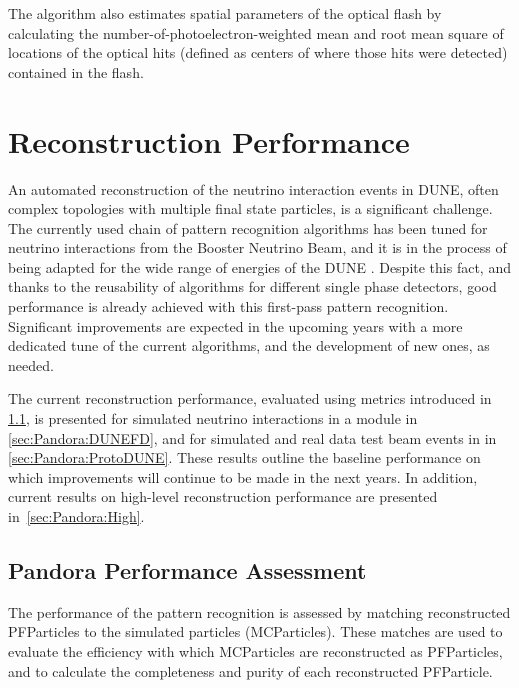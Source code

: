The algorithm also estimates spatial parameters of the optical flash
by calculating the number-of-photoelectron-weighted mean and 
root mean square of locations of the optical hits
(defined as centers of  where those hits were detected)
contained in the flash.

\section{Reconstruction Performance}
\label{sec:performance}

An automated reconstruction of the neutrino interaction events in DUNE, often complex topologies with multiple final state particles, is a significant challenge. The currently used chain of  pattern recognition algorithms %
has been tuned for neutrino interactions from the \fnal Booster Neutrino Beam, and it is in the process of being adapted for the wide range of energies of the DUNE . Despite this fact, and thanks to the reusability of  algorithms for different single phase \lartpc detectors,  good performance is already achieved with this first-pass pattern recognition. Significant improvements are expected  in the upcoming years with a more dedicated tune of the current algorithms, and the development of new ones, as needed. %

The current reconstruction performance, evaluated using metrics introduced in \ref{sec:Pandora:assessment}, is presented for simulated neutrino interactions in a \single \nominalmodsize {} module in \ref{sec:Pandora:DUNEFD}, and for simulated and real data test beam events in  in \ref{sec:Pandora:ProtoDUNE}. These results outline the baseline performance on which improvements will continue to be made in the next years. In addition, current results on high-level reconstruction performance are presented in~\ref{sec:Pandora:High}.

\subsection{Pandora Performance Assessment}
\label{sec:Pandora:assessment}
The performance of the  pattern recognition is assessed by matching reconstructed PFParticles to the simulated  particles (MCParticles). These matches are used to evaluate the efficiency with which MCParticles are reconstructed as PFParticles, and to calculate the completeness and purity of each reconstructed PFParticle. 

